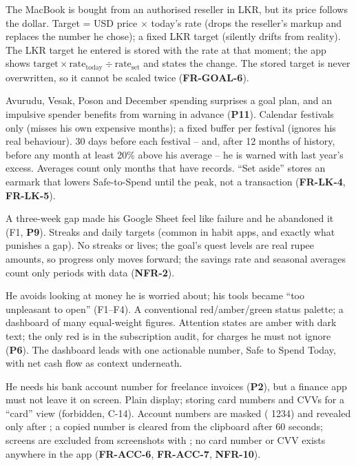 \documentclass[11pt,a4paper]{article}
\newcommand{\req}[1]{\textsf{\textbf{\color{pfgreendark}#1}}}
\newcommand{\prob}[1]{\textsf{\textbf{\color{pfamberdark}#1}}}
\begin{document}
{The MacBook is bought from an authorised reseller in LKR, but its price follows the dollar.}
{Target = USD price $\times$ today's rate (drops the reseller's markup and replaces the number he chose); a fixed LKR target (silently drifts from reality).}
{The LKR target he entered is stored with the rate at that moment; the app shows \(\text{target}\times\text{rate}_{\text{today}}\div\text{rate}_{\text{set}}\) and states the change. The stored target is never overwritten, so it cannot be scaled twice (\req{FR-GOAL-6}).}

{Avurudu, Vesak, Poson and December spending surprises a goal plan, and an impulsive spender benefits from warning in advance (\prob{P11}).}
{Calendar festivals only (misses his own expensive months); a fixed buffer per festival (ignores his real behaviour).}
{30 days before each festival -- and, after 12 months of history, before any month at least 20\% above his average -- he is warned with last year's excess. Averages count only months that have records. ``Set aside'' stores an earmark that lowers Safe-to-Spend until the peak, not a transaction (\req{FR-LK-4}, \req{FR-LK-5}).}

{A three-week gap made his Google Sheet feel like failure and he abandoned it (F1, \prob{P9}).}
{Streaks and daily targets (common in habit apps, and exactly what punishes a gap).}
{No streaks or lives; the goal's quest levels are real rupee amounts, so progress only moves forward; the savings rate and seasonal averages count only periods with data (\req{NFR-2}).}

{He avoids looking at money he is worried about; his tools became ``too unpleasant to open'' (F1--F4).}
{A conventional red/amber/green status palette; a dashboard of many equal-weight figures.}
{Attention states are amber with dark text; the only red is in the subscription audit, for charges he must not ignore (\prob{P6}). The dashboard leads with one actionable number, Safe to Spend Today, with net cash flow as context underneath.}

{He needs his bank account number for freelance invoices (\prob{P2}), but a finance app must not leave it on screen.}
{Plain display; storing card numbers and CVVs for a ``card'' view (forbidden, C-14).}
{Account numbers are masked (\textbullet\textbullet\textbullet\textbullet{} 1234) and revealed only after ; a copied number is cleared from the clipboard after 60 seconds; screens are excluded from screenshots with ; no card number or CVV exists anywhere in the app (\req{FR-ACC-6}, \req{FR-ACC-7}, \req{NFR-10}).}
\end{document}
